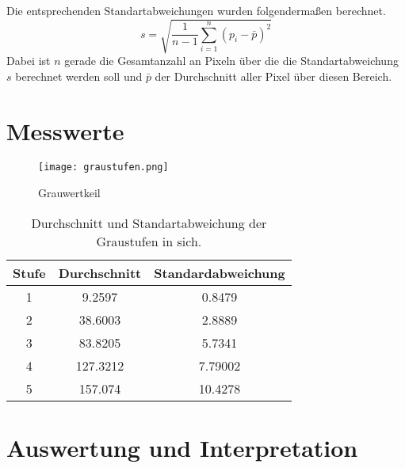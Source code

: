 Die entsprechenden Standartabweichungen wurden folgendermaßen berechnet.
\begin{equation}
s = \sqrt{\frac{1}{n-1}\sum_{i=1}^{n} (p_i- \bar{p})^2}
\end{equation}
Dabei ist $n$ gerade die Gesamtanzahl an Pixeln über die die Standartabweichung $s$ berechnet werden soll und $\bar{p}$ der Durchschnitt aller Pixel über diesen Bereich.

\section{Messwerte}
\label{chap:VERSUCH_1_MESSWERTE}
\begin{figure}[H]
\centering
\texttt{[image: graustufen.png]}
\caption{Grauwertkeil}
\label{img:Grauwertkeil}
\end{figure}
\begin{table}
\centering
\begin{tabular}{c|cc}
Stufe & Durchschnitt & Standardabweichung \\
\hline
1 & 9.2597 & 0.8479 \\
2 & 38.6003 & 2.8889 \\
3 & 83.8205 & 5.7341\\
4 & 127.3212 & 7.79002 \\
5 & 157.074 & 10.4278 \\
\end{tabular}
\caption{Durchschnitt und Standartabweichung der Graustufen in sich.}
\label{tab:GrauStufen_Mean}
\end{table}
\section{Auswertung und Interpretation}
\label{chap:VERSUCH_1_AUSWERTUNG}
